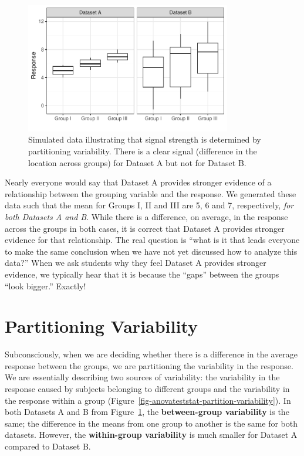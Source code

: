 \documentclass[
  letterpaper,
  DIV=11,
  numbers=noendperiod]{scrreprt}
\theoremstyle{plain}
\theoremstyle{definition}
\theoremstyle{definition}
\theoremstyle{remark}
\begin{document}
\begin{figure}

{\centering \includegraphics[width=0.8\textwidth,height=\textheight]{./images/fig-anovateststat-boxplots-1.pdf}

}

\caption{\label{fig-anovateststat-boxplots}Simulated data illustrating
that signal strength is determined by partitioning variability. There is
a clear signal (difference in the location across groups) for Dataset A
but not for Dataset B.}

\end{figure}

Nearly everyone would say that Dataset A provides stronger evidence of a
relationship between the grouping variable and the response. We
generated these data such that the mean for Groups I, II and III are 5,
6 and 7, respectively, \emph{for both Datasets A and B}. While there is
a difference, on average, in the response across the groups in both
cases, it is correct that Dataset A provides stronger evidence for that
relationship. The real question is ``what is it that leads everyone to
make the same conclusion when we have not yet discussed how to analyze
this data?'' When we ask students why they feel Dataset A provides
stronger evidence, we typically hear that it is because the ``gaps''
between the groups ``look bigger.'' Exactly!

\hypertarget{partitioning-variability-1}{%
\section{Partitioning Variability}\label{partitioning-variability-1}}

Subconsciously, when we are deciding whether there is a difference in
the average response between the groups, we are partitioning the
variability in the response. We are essentially describing two sources
of variability: the variability in the response caused by subjects
belonging to different groups and the variability in the response within
a group (Figure~\ref{fig-anovateststat-partition-variability}). In both
Datasets A and B from Figure~\ref{fig-anovateststat-boxplots}, the
\textbf{between-group variability} is the same; the difference in the
means from one group to another is the same for both datasets. However,
the \textbf{within-group variability} is much smaller for Dataset A
compared to Dataset B.
\end{document}
